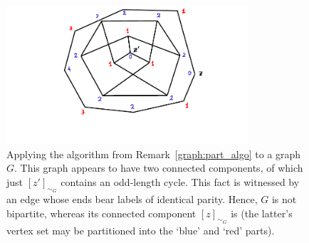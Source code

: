 \documentclass[12pt,notitlepage]{article}
\theoremstyle{plain}
\theoremstyle{definition}
\theoremstyle{plain}
\newcommand{\1}{\mathbf{1}}
\newcommand{\0}{\mathbf{0}}
\begin{document}
\begin{figure}[h]
\centering
\includegraphics*[width=0.8\textwidth]{graph_bipartite_algo.pdf}
\caption{Applying the algorithm from Remark~\ref{graph:part_algo} to a graph $G$. This graph appears to have two connected components, of which just $[z']_{\sim_G}$ contains an odd-length cycle. This fact is witnessed by an edge whose ends bear labels of identical parity. Hence, $G$ is not bipartite, whereas its connected component $[z]_{\sim_G}$ is (the latter's vertex set may be partitioned into the `blue' and `red' parts).}
\end{figure}
\end{document}
